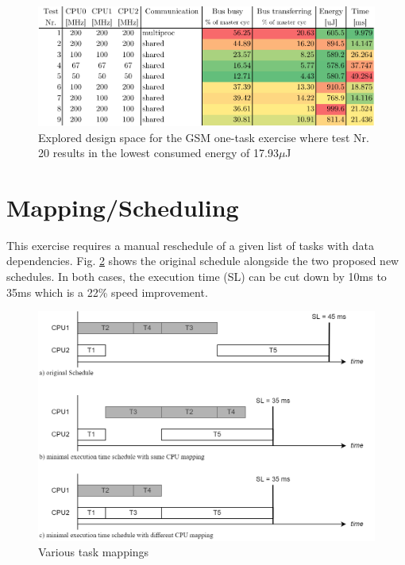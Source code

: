 \documentclass[10pt,bibliography=totocnumbered,listof=totocnumbered, footsepline, headsepline]{scrreprt}
\begin{document}


\begin{figure}[H]
	\centerline{\includegraphics[width=34pc]{mparm_2_com.pdf}}
	\caption{Explored design space for the GSM one-task exercise where test Nr. 20 results in the lowest consumed energy of 17.93$\mu$J}
	\label{fig:mparm_2_com}
\end{figure}


\section{Mapping/Scheduling}

This exercise requires a manual reschedule of a given list of tasks with data dependencies.
Fig. \ref{fig:CPU_Schedule} shows the original schedule alongside the two proposed new schedules.
In both cases, the execution time (SL) can be cut down by 10ms to 35ms which is a 22\% speed improvement.

    \begin{figure}[h]
    	\centerline{\includegraphics[width=34pc]{CPU_Schedules.png}}
    	\caption{Various task mappings}
    	\label{fig:CPU_Schedule}
    \end{figure}    
\end{document}
